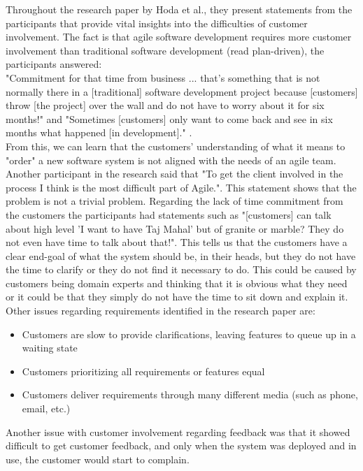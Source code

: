 Throughout the research paper by Hoda et al., they present statements from the participants that provide vital insights into the difficulties of customer involvement. 
The fact is that agile software development requires more customer involvement than traditional software development (read plan-driven), the participants answered: \\
"Commitment for that time from business ... that's something that is not normally there in a [traditional] software development project because [customers] throw [the project] over the wall and do not have to worry about it for six months!" and "Sometimes [customers] only want to come back and see in six months what happened [in development]." \cite{Hoda2011TheIO}. \\ 
From this, we can learn that the customers' understanding of what it means to "order" a new software system is not aligned with the needs of an agile team. 
Another participant in the research said that "To get the client involved in the process I think is the most difficult part of Agile."\cite{Hoda2011TheIO}. 
This statement shows that the problem is not a trivial problem. 
Regarding the lack of time commitment from the customers the participants had statements such as "[customers] can talk about high level 'I want to have Taj Mahal' but of granite or marble? They do not even have time to talk about that!"\cite{Hoda2011TheIO}. 
This tells us that the customers have a clear end-goal of what the system should be, in their heads, but they do not have the time to clarify or they do not find it necessary to do. 
This could be caused by customers being domain experts and thinking that it is obvious what they need or it could be that they simply do not have the time to sit down and explain it. 
Other issues regarding requirements identified in the research paper are:
\begin{itemize}
 \item Customers are slow to provide clarifications, leaving features to queue up in a waiting state
 \item Customers prioritizing all requirements or features equal
 \item Customers deliver requirements through many different media (such as phone, email, etc.)
\end{itemize}

Another issue with customer involvement regarding feedback was that it showed difficult to get customer feedback, and only when the system was deployed and in use, the customer would start to complain.

